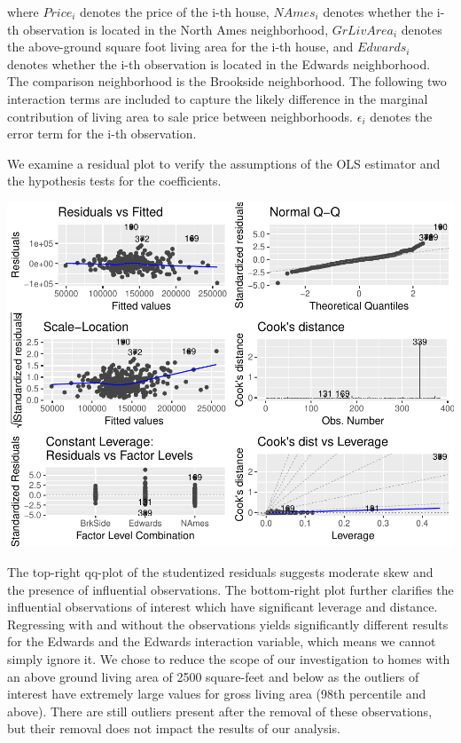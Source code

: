 \documentclass[american,]{article}
\begin{document}
where \(Price_i\) denotes the price of the i-th house, \(NAmes_i\)
denotes whether the i-th observation is located in the North Ames
neighborhood, \(GrLivArea_i\) denotes the above-ground square foot
living area for the i-th house, and \(Edwards_i\) denotes whether the
i-th observation is located in the Edwards neighborhood. The comparison
neighborhood is the Brookside neighborhood. The following two
interaction terms are included to capture the likely difference in the
marginal contribution of living area to sale price between
neighborhoods. \(\epsilon_i\) denotes the error term for the i-th
observation.

We examine a residual plot to verify the assumptions of the OLS
estimator and the hypothesis tests for the coefficients.

\includegraphics{HousePricesPaper_files/figure-latex/residualplot-1.pdf}

The top-right qq-plot of the studentized residuals suggests moderate
skew and the presence of influential observations. The bottom-right plot
further clarifies the influential observations of interest which have
significant leverage and distance. Regressing with and without the
observations yields significantly different results for the Edwards and
the Edwards interaction variable, which means we cannot simply ignore
it. We chose to reduce the scope of our investigation to homes with an
above ground living area of 2500 square-feet and below as the outliers
of interest have extremely large values for gross living area (98th
percentile and above). There are still outliers present after the
removal of these observations, but their removal does not impact the
results of our analysis.
\end{document}
